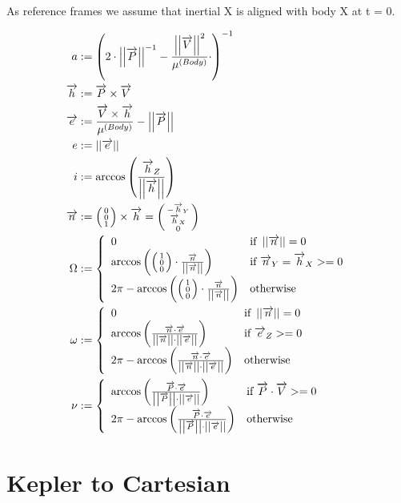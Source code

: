 \documentclass[11pt]{report}
\newcommand{\oa}[1]{\overrightarrow{#1}}
\newcommand{\Pos}{\oa{P}}
\newcommand{\Vel}{\oa{V}}
\newcommand{\absvec}[1]{\left|\left|{#1}\right|\right|}
\newcommand{\dddvec}[3]{\left(\begin{smallmatrix}{#1}\\{#2}\\{#3}\end{smallmatrix}\right)}
\begin{document}
As reference frames we assume that inertial X is aligned with body X
at t = 0.

\begin{align}
  a &:= \left(2\cdot\absvec{\Pos}^{-1} - \frac{\absvec{\Vel}^2}{\mu^{(Body)}}\cdot \right)^{-1}\\
  \oa{h} &:= \Pos \times \Vel\nonumber\\
  \oa{e} &:= \frac{\Vel\times \oa{h}}{\mu^{(Body)}} - \absvec{\Pos}\nonumber\\
  e &:= \absvec{\oa{e}}\\
  i &:= \arccos\left(\frac{\oa{h}_Z}{\absvec{\oa{h}}} \right)\\
  \oa{n} & := \dddvec{0}{0}{1} \times \oa{h} = \dddvec{-\oa{h}_Y}{\oa{h}_X}{0}\nonumber\\
  \Omega &:= \left\{
    \begin{array}{l l}
      0 & \textrm{if } \absvec{\oa{n}} = 0\\
      \arccos\left(\dddvec{1}{0}{0}\cdot\frac{\oa{n}}{\absvec{\oa{n}}} \right) & \textrm{if } \oa{n}_Y = \oa{h}_X >= 0\\
      2\pi - \arccos\left(\dddvec{1}{0}{0}\cdot\frac{\oa{n}}{\absvec{\oa{n}}} \right) & \textrm{otherwise}
    \end{array}
    \right.\\
  \omega & := \left\{
    \begin{array}{l l}
      0 & \textrm{if } \absvec{\oa{n}} = 0\\
      \arccos\left(\frac{\oa{n}\cdot\oa{e}}{\absvec{\oa{n}}\cdot\absvec{\oa{e}}} \right) & \textrm{if } \oa{e}_Z >= 0\\
      2\pi - \arccos\left(\frac{\oa{n}\cdot\oa{e}}{\absvec{\oa{n}}\cdot\absvec{\oa{e}}}\right) & \textrm{otherwise}
    \end{array}
    \right.\\
    \nu &:= \left\{
    \begin{array}{l l}
      \arccos\left(\frac{\Pos\cdot\oa{e}}{\absvec{\Pos}\cdot\absvec{\oa{e}}}\right) & \textrm{if } \Pos\cdot\Vel >= 0\\
      2\pi - \arccos\left(\frac{\Pos\cdot\oa{e}}{\absvec{\Pos}\cdot\absvec{\oa{e}}}\right) & \textrm{otherwise}
    \end{array}
    \right.
\end{align}

\section{Kepler to Cartesian}
\end{document}
